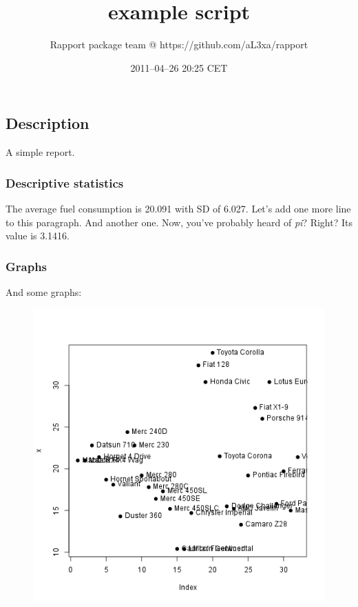 \documentclass{article}
\title{example script}
\author{Rapport package team @ https://github.com/aL3xa/rapport}
\date{2011--04--26 20:25 CET}
\makeatletter
\def\maxwidth{\ifdim\Gin@nat@width>\linewidth\linewidth
\else\Gin@nat@width\fi}
\let\Oldincludegraphics\includegraphics
\renewcommand{\includegraphics}[1]{\Oldincludegraphics[width=\maxwidth]{#1}}
\makeatother
\begin{document}
\maketitle

\subsection{Description}

A simple report.

\subsubsection{Descriptive statistics}

The average fuel consumption is 20.091 with SD of 6.027. Let's add one
more line to this paragraph. And another one. Now, you've probably heard
of \emph{pi}? Right? Its value is 3.1416.

\subsubsection{Graphs}

And some graphs:

\begin{figure}[htbp]
\centering
\includegraphics{KKORo27NO5ORo5llNoO38oO7e2OWO2IOO757OolWmlQ87hPGOlJeOjOv5om7NP7hPGOQ5ANQOjOo8RoI5HNOholoB575oGOl8OOjOto.png}
\caption{}
\end{figure}
\end{document}

